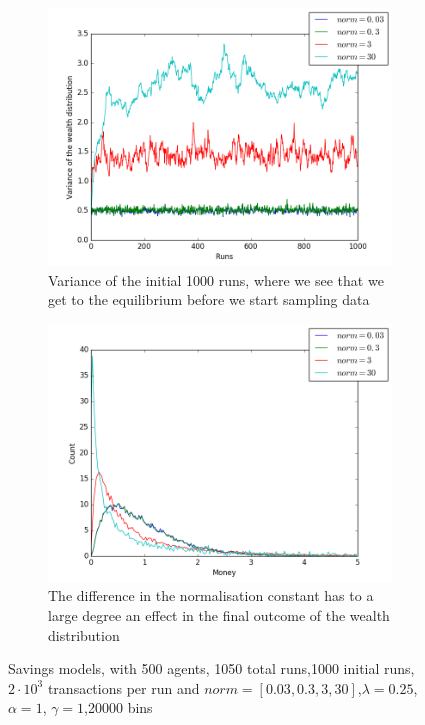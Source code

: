 \documentclass[a4paper,11pt]{article}
\begin{document}
{\begin{figure}[H]
	\centering
	\begin{subfigure}[t]{0.45\textwidth}
		\includegraphics[scale=0.4]{norminit}
		\caption{Variance of the initial 1000 runs, where we see that we get to the equilibrium before we start sampling data}
		\label{fig:norminit}
	\end{subfigure}
	\begin{subfigure}[t]{0.45\textwidth}
		\includegraphics[scale=0.4]{norm}
		\caption{The difference in the normalisation constant has to a large degree an effect in the final outcome of the wealth distribution}
		\label{fig:norm}
	\end{subfigure}
	\caption{Savings models, with 500 agents, 1050 total runs,1000 initial runs,  $2\cdot 10^{3}$ transactions per run and  $norm=[0.03,0.3,3,30]$,$\lambda=0.25$, $\alpha=1$, $\gamma=1$,20000 bins}
	\label{fig:norm}
\end{figure}




}
\end{document}
